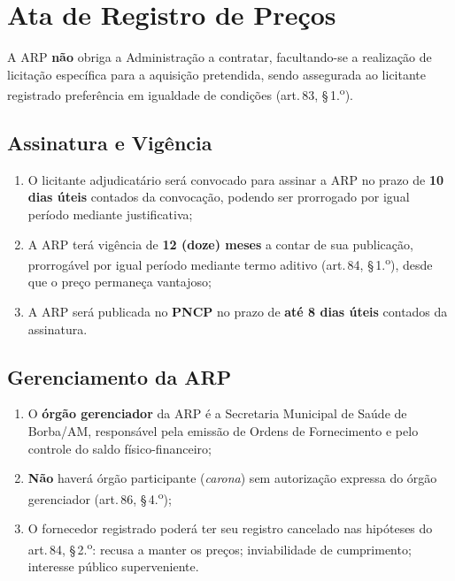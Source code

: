 \documentclass[12pt,a4paper]{article}
\newcommand{\art}[1]{art.\,#1}
\begin{document}
\section{Ata de Registro de Preços}

\begin{legalbox}
\small
A ARP \textbf{não} obriga a Administração a contratar, facultando-se a realização
de licitação específica para a aquisição pretendida, sendo assegurada ao licitante
registrado preferência em igualdade de condições (\art{83}, \S\,1.\textsuperscript{o}).
\end{legalbox}

\subsection{Assinatura e Vigência}

\begin{enumerate}
  \item O licitante adjudicatário será convocado para assinar a ARP no prazo de
    \textbf{10 dias úteis} contados da convocação, podendo ser prorrogado por
    igual período mediante justificativa;

  \item A ARP terá vigência de \textbf{12 (doze) meses} a contar de sua publicação,
    prorrogável por igual período mediante termo aditivo (\art{84},
    \S\,1.\textsuperscript{o}), desde que o preço permaneça vantajoso;

  \item A ARP será publicada no \textbf{PNCP} no prazo de \textbf{até 8 dias úteis}
    contados da assinatura.
\end{enumerate}

\subsection{Gerenciamento da ARP}

\begin{enumerate}
  \item O \textbf{órgão gerenciador} da ARP é a Secretaria Municipal de Saúde de
    Borba/AM, responsável pela emissão de Ordens de Fornecimento e pelo controle
    do saldo físico-financeiro;

  \item \textbf{Não} haverá órgão participante (\textit{carona}) sem autorização
    expressa do órgão gerenciador (\art{86}, \S\,4.\textsuperscript{o});

  \item O fornecedor registrado poderá ter seu registro cancelado nas hipóteses do
    \art{84}, \S\,2.\textsuperscript{o}: recusa a manter os preços; inviabilidade
    de cumprimento; interesse público superveniente.
\end{enumerate}
\end{document}
